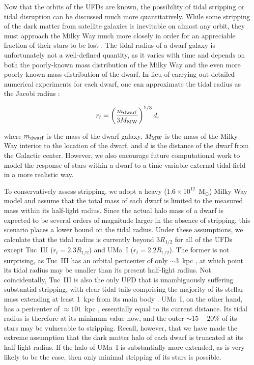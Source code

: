 \documentclass[a4paper]{ar-1col}
\newcommand{\msun}        {M$_{\odot}$}
\begin{document}
Now that the orbits of the UFDs are known, the possibility of tidal
stripping or tidal disruption can be discussed much more
quantitatively.  While some stripping of the dark matter from
satellite galaxies is inevitable on almost any orbit, they must
approach the Milky Way much more closely in order for an appreciable
fraction of their stars to be lost \citep{penarrubia08}.  The tidal
radius of a dwarf galaxy is unfortunately not a well-defined quantity,
as it varies with time and depends on both the poorly-known mass
distribution of the Milky Way and the even more poorly-known mass
distribution of the dwarf.  In lieu of carrying out detailed numerical
experiments for each dwarf, one can approximate the tidal radius as
the Jacobi radius \citep{bt08}:

\begin{equation}
r_{t} = \left( \frac{m_{{\rm dwarf}}}{3M_{{\rm MW}}} \right)^{1/3} d,
\end{equation}

\noindent
where $m_{{\rm dwarf}}$ is the mass of the dwarf galaxy, $M_{{\rm
    MW}}$ is the mass of the Milky Way interior to the location of the
dwarf, and $d$ is the distance of the dwarf from the Galactic center.
However, we also encourage future computational work to model the
response of stars within a dwarf to a time-variable external tidal
field in a more realistic way.

To conservatively assess stripping, we adopt a heavy ($1.6 \times
10^{12}$~\msun) Milky Way model and assume that the total mass of each
dwarf is limited to the measured mass within its half-light radius.
Since the actual halo mass of a dwarf is expected to be several orders
of magnitude larger in the absence of stripping, this scenario places
a lower bound on the tidal radius.  Under these assumptions, we
calculate that the tidal radius is currently beyond $3 R_{1/2}$ for
all of the UFDs except Tuc~III ($r_{t} = 2.3 R_{1/2}$) and UMa~I
($r_{t} = 2.2 R_{1/2}$).  The former is not surprising, as Tuc~III has
an orbital pericenter of only $\sim3$~kpc
\citep{erkal18,simon18,fritz18}, at which point its tidal radius may
be smaller than its present half-light radius.  Not coincidentally,
Tuc~III is also the only UFD that is unambiguously suffering
substantial stripping, with clear tidal tails comprising the majority
of its stellar mass extending at least 1~kpc from its main body
\citep{drlica15,shipp18,li18b,erkal18}.  UMa~I, on the other hand, has
a pericenter of $\approx101$~kpc \citep{simon18,fritz18}, essentially
equal to its current distance.  Its tidal radius is therefore at its
minimum value now, and the outer $\sim15-20$\% of its stars may be
vulnerable to stripping.  Recall, however, that we have made the
extreme assumption that the dark matter halo of each dwarf is
truncated at its half-light radius.  If the halo of UMa~I is
substantially more extended, as is very likely to be the case, then
only minimal stripping of its stars is possible.
\end{document}
